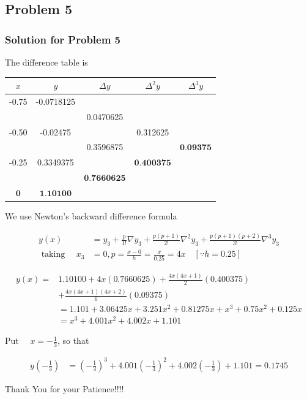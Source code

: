 \documentclass{beamer}
\begin{document}
\subsection{Problem 5}
\begin{frame}
\frametitle{Solution for Problem 5}
The difference table is

\begin{center}
\begin{tabular}{|c|c|c|c|c|}
\hline
$x$ & $y$ & $\Delta y$ & $\Delta^{2} y$ & $\Delta^{3} y$ \\
\hline
-0.75 & -0.0718125 &  &  &  \\
\hline
 &  & 0.0470625 &  &  \\
\hline
-0.50 & -0.02475 &  & 0.312625 &  \\
\hline
 &  & 0.3596875 &  & $\mathbf{0 . 0 9 3 7 5}$ \\
\hline
-0.25 & 0.3349375 &  & $\mathbf{0 . 4 0 0 3 7 5}$ &  \\
\hline
 &  & $\mathbf{0 . 7 6 6 0 6 2 5}$ &  &  \\
\hline
$\mathbf{0}$ & $\mathbf{1 . 1 0 1 0 0}$ &  &  &  \\
\hline
\end{tabular}
\end{center}
\end{frame}
\begin{frame}{}
We use Newton's backward difference formula

$$
\begin{aligned}
y(x) & =y_{3}+\frac{p}{1 !} \nabla y_{3}+\frac{p(p+1)}{2 !} \nabla^{2} y_{3}+\frac{p(p+1)(p+2)}{3 !} \nabla^{3} y_{3} \\
\text { taking } \quad x_{3} & =0, p=\frac{x-0}{h}=\frac{x}{0.25}=4 x \quad[\because h=0.25]
\end{aligned}
$$

$$
\begin{aligned}
y(x)= & 1.10100+4 x(0.7660625)+\frac{4 x(4 x+1)}{2}(0.400375) \\
& +\frac{4 x(4 x+1)(4 x+2)}{6}(0.09375) \\
& =1.101+3.06425 x+3.251 x^{2}+0.81275 x+x^{3}+0.75 x^{2}+0.125 x \\
& =x^{3}+4.001 x^{2}+4.002 x+1.101
\end{aligned}
$$

Put $\quad x=-\frac{1}{3}$, so that

$$
\begin{aligned}
y\left(-\frac{1}{3}\right) & =\left(-\frac{1}{3}\right)^{3}+4.001\left(-\frac{1}{3}\right)^{2}+4.002\left(-\frac{1}{3}\right)+1.101 = 0.1745
\end{aligned}
$$
\end{frame}
\begin{frame}
\begin{center}
{\fontsize{40}{50}\selectfont Thank You for your Patience!!!!}
\end{center}
\end{frame}
\end{document}
